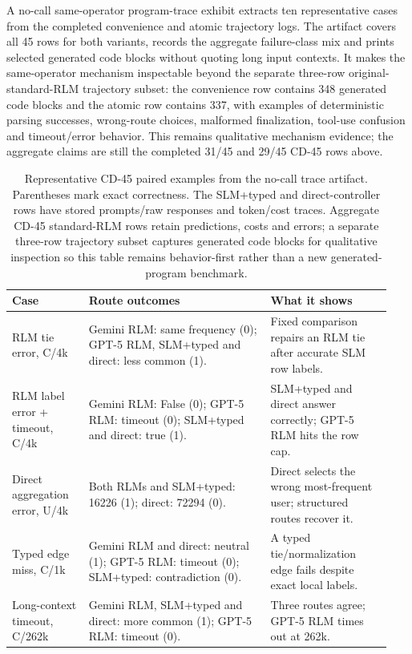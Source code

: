 A no-call same-operator program-trace exhibit extracts ten representative cases from the completed convenience and atomic trajectory logs. The artifact covers all 45 rows for both variants, records the aggregate failure-class mix and prints selected generated code blocks without quoting long input contexts. It makes the same-operator mechanism inspectable beyond the separate three-row original-standard-RLM trajectory subset: the convenience row contains 348 generated code blocks and the atomic row contains 337, with examples of deterministic parsing successes, wrong-route choices, malformed finalization, tool-use confusion and timeout/error behavior. This remains qualitative mechanism evidence; the aggregate claims are still the completed 31/45 and 29/45 CD-45 rows above.

\begin{table}[!t]
\centering
\small
\setlength{\tabcolsep}{3pt}
\begin{tabular}{@{}L{0.19\linewidth}L{0.45\linewidth}L{0.30\linewidth}@{}}
\toprule
\textbf{Case} & \textbf{Route outcomes} & \textbf{What it shows} \\
\midrule
RLM tie error, C/4k & Gemini RLM: same frequency (0); GPT-5 RLM, SLM+typed and direct: less common (1). & Fixed comparison repairs an RLM tie after accurate SLM row labels. \\
RLM label error + timeout, C/4k & Gemini RLM: False (0); GPT-5 RLM: timeout (0); SLM+typed and direct: true (1). & SLM+typed and direct answer correctly; GPT-5 RLM hits the row cap. \\
Direct aggregation error, U/4k & Both RLMs and SLM+typed: 16226 (1); direct: 72294 (0). & Direct selects the wrong most-frequent user; structured routes recover it. \\
Typed edge miss, C/1k & Gemini RLM and direct: neutral (1); GPT-5 RLM: timeout (0); SLM+typed: contradiction (0). & A typed tie/normalization edge fails despite exact local labels. \\
Long-context timeout, C/262k & Gemini RLM, SLM+typed and direct: more common (1); GPT-5 RLM: timeout (0). & Three routes agree; GPT-5 RLM times out at 262k. \\
\bottomrule
\end{tabular}
\caption{Representative CD-45 paired examples from the no-call trace artifact. Parentheses mark exact correctness. The SLM+typed and direct-controller rows have stored prompts/raw responses and token/cost traces. Aggregate CD-45 standard-RLM rows retain predictions, costs and errors; a separate three-row trajectory subset captures generated code blocks for qualitative inspection so this table remains behavior-first rather than a new generated-program benchmark.}
\label{tab:supp-cd45-trace-examples}
\end{table}

